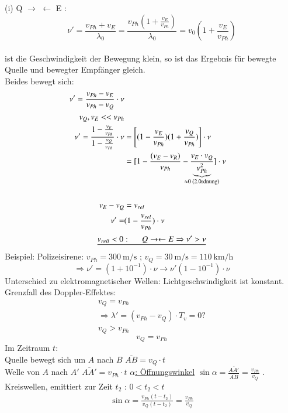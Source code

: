 (i) Q $ \rightarrow $ $ \leftarrow $ E :\\
$$ \nu'  = \frac{v_{Ph}+v_E}{\lambda_0} = \frac{v_{Ph}(1+\frac{v_E}{v_{Ph}})}{\lambda_0}=v_0(1+\frac{v_E}{v_{Ph}})$$\\
ist die Geschwindigkeit der Bewegung klein, so ist das Ergebnis für bewegte Quelle und bewegter Empfänger gleich.\\
Beides bewegt sich: \bild
\begin{align*}
\nu'=\frac{v_{Ph}-v_E}{v_{Ph}-v_Q} \cdot \nu \\
v_Q,v_E << v_{Ph}\\
\nu'=\frac{1-\frac{v_E}{v_{Ph}}}{1-\frac{v_Q}{v_{Ph}}} \cdot \nu &= \left[ (1-\frac{v_E}{v_{Ph}}) (1+\frac{v_Q}{v_{Ph}})  \right] \cdot \nu \\
&= [ 1-\frac{(v_E-v_R)}{v_{Ph}} - \frac{v_E \cdot v_Q}{\underbrace{v^2_{Ph}}_{\mathclap{\approx 0 \text{ (2.0rdnung)}}}}  ] \cdot \nu\\
\enter
v_E-v_Q&=v_{rel}\\
\nu'=&(1-\frac{v_{rel}}{v_{Ph}}) \cdot \nu
\end{align*}
$$ \underline{v_{rell} < 0: \hspace{5mm} Q\rightarrow\leftarrow E \Rightarrow \nu' > \nu} $$
\bild
Beispiel: Polizeisirene: $ v_{Ph} = \SI{300}{\meter\per\second} $ ; $ v_Q=\SI{30}{\meter\per\second} = \SI{110}{\kilo\meter\per\hour}$
$$ \Rightarrow \nu'=(1+10^{-1}) \cdot \nu \longrightarrow \nu' (1-10^{-1}) \cdot \nu $$
\HL
Unterschied zu elektromagnetischer Wellen: Lichtgeschwindigkeit ist konstant.\\
Grenzfall des Doppler-Effektes:
\begin{align*}
v_Q=v_{Ph}\\
\Rightarrow \lambda'=(v_{Ph} - v_Q) \cdot T_v = 0?\\
v_Q > v_{Ph}
\end{align*}
\bild
$$ v_Q=v_{Ph} $$
\bild
Im Zeitraum $ t $:\\
Quelle bewegt sich um $ A $ nach $ B $ \hspace{1cm} $\overline{AB} = v_Q \cdot t$\\
Welle von $ A $ nach $ A' $ \hspace{1cm} $ \overline{AA'} = v_{Ph} \cdot t $
\enter
\underline{$ \alpha $: Öffnungswinkel} $ \sin\alpha = \frac{\overline{AA'}}{\overline{AB}} = \frac{v_{Ph}}{v_Q}$
. Kreiswellen, emittiert zur Zeit $ t_2 $ : $ 0<t_2<t $
\begin{align*}
\sin\alpha = \frac{v_{Ph} (t-t_2)}{v_Q(t-t_2)} = \frac{v_{Ph}}{v_Q}
\end{align*}
